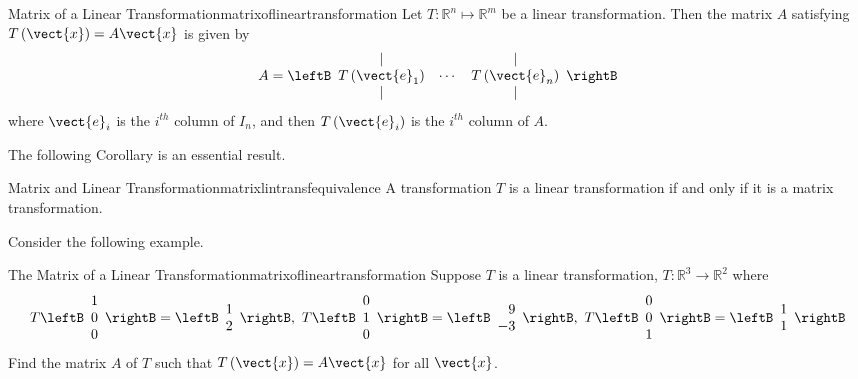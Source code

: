 \begin{theorem}{Matrix of a Linear Transformation}{matrixoflineartransformation}
Let $T: \mathbb{R}^{n} \mapsto \mathbb{R}^{m}$ be a linear transformation. Then the matrix $A$ satisfying $T\left(\vect{x}\right)=A\vect{x}$ is given by
\begin{equation*}
A=
\leftB
\begin{array}{ccc}
| &  & | \\
T\left( \vect{e}_{1}\right) & \cdots & T\left( \vect{e}_{n}\right) \\
| &  & |
\end{array}
\rightB
\end{equation*}
where $\vect{e}_{i}$ is the $i^{th}$ column of $I_n$, and then $T\left( \vect{e}_{i}
\right)$ is the $i^{th}$ column of $A.$
\end{theorem}

The following Corollary is an essential result.

\begin{corollary}{Matrix and Linear Transformation}{matrixlintransfequivalence}
A transformation $T$ is a linear transformation if and only if it is a matrix transformation. 
\end{corollary}

Consider the following example.

\begin{example}{The Matrix of a Linear Transformation}{matrixoflineartransformation}
Suppose $T$ is a linear transformation, $T:\mathbb{R}^{3}\rightarrow \mathbb{
R}^{2}$ where 
\begin{equation*}
T\leftB
\begin{array}{r}
1 \\
0 \\
0
\end{array}
\rightB =\leftB
\begin{array}{r}
1 \\
2
\end{array}
\rightB ,\ T\leftB
\begin{array}{r}
0 \\
1 \\
0
\end{array}
\rightB =\leftB
\begin{array}{r}
9 \\
-3
\end{array}
\rightB ,\ T\leftB
\begin{array}{r}
0 \\
0 \\
1
\end{array}
\rightB =\leftB
\begin{array}{r}
1 \\
1
\end{array}
\rightB
\end{equation*}
Find the matrix $A$ of $T$ such that $T \left( \vect{x} \right)=A\vect{x}$  for all $\vect{x}$.
\end{example}

